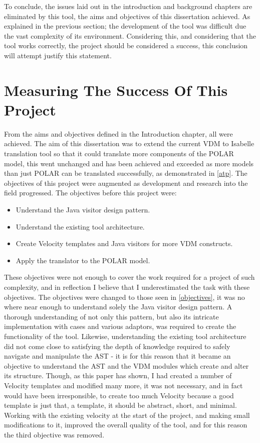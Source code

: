 To conclude, the issues laid out in the introduction and background chapters are eliminated by this tool, the aims and objectives of this dissertation achieved. As explained in the previous section; the development of the tool was difficult due the vast complexity of its environment. Considering this, and considering that the tool works correctly, the project should be considered a success, this conclusion will attempt justify this statement. 

\section{Measuring The Success Of This Project}
From the aims and objectives defined in the Introduction chapter, all were achieved. The aim of this dissertation was to extend the current VDM to Isabelle translation tool so that it could translate more components of the POLAR model, this went unchanged and has been achieved and exceeded as more models than just POLAR can be translated successfully, as demonstrated in \ref{atp}. The objectives of this project were augmented as development and research into the field progressed. The objectives before this project were:
\begin{itemize}
	\item Understand the Java visitor design pattern.
	\item Understand the existing tool architecture.
	\item Create Velocity templates and Java visitors for more VDM constructs.
	\item Apply the translator to the POLAR model.
\end{itemize}

These objectives were not enough to cover the work required for a project of such complexity, and in reflection I believe that I underestimated the task with these objectives. The objectives were changed to those seen in \ref{objectives}, it was no where near enough to understand solely the Java visitor design pattern. A thorough understanding of not only this pattern, but also its intricate implementation with cases and various adaptors, was required to create the functionality of the tool. Likewise, understanding the existing tool architecture did not come close to satisfying the depth of knowledge required to safely navigate and manipulate the AST - it is for this reason that it became an objective to understand the AST and the VDM modules which create and alter its structure. Though, as this paper has shown, I had created a number of Velocity templates and modified many more, it was not necessary, and in fact would have been irresponsible, to create too much Velocity because a good template is just that, a template, it should be abstract, short, and minimal. Working with the existing velocity at the start of the project, and making small modifications to it, improved the overall quality of the tool, and for this reason the third objective was removed. 


